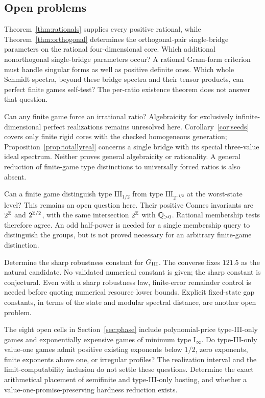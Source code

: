 \subsection{Open problems}
Theorem~\ref{thm:rationals} supplies every positive rational, while Theorem~\ref{thm:orthogonal} determines the orthogonal-pair single-bridge parameters on the rational four-dimensional core. Which additional nonorthogonal single-bridge parameters occur? A rational Gram-form criterion must handle singular forms as well as positive definite ones. Which whole Schmidt spectra, beyond these bridge spectra and their tensor products, can perfect finite games self-test? The per-ratio existence theorem does not answer that question.

Can any finite game force an irrational ratio? Algebraicity for exclusively infinite-dimensional perfect realizations remains unresolved here. Corollary~\ref{cor:seeds} covers only finite rigid cores with the checked homogeneous generation; Proposition~\ref{prop:totallyreal} concerns a single bridge with its special three-value ideal spectrum. Neither proves general algebraicity or rationality. A general reduction of finite-game type distinctions to universally forced ratios is also absent.

Can a finite game distinguish type $\mathrm{III}_{1/2}$ from type $\mathrm{III}_{2^{-1/2}}$ at the worst-state level? This remains an open question here. Their positive Connes invariants are $2^\mathbb Z$ and $2^{\mathbb Z/2}$, with the same intersection $2^\mathbb Z$ with $\mathbb Q_{>0}$. Rational membership tests therefore agree. An odd half-power is needed for a single membership query to distinguish the groups, but is not proved necessary for an arbitrary finite-game distinction.

Determine the sharp robustness constant for $G_{\mathrm{III}}$. The converse fixes $121.5$ as the natural candidate. No validated numerical constant is given; the sharp constant is conjectural. Even with a sharp robustness law, finite-error remainder control is needed before quoting numerical resource lower bounds. Explicit fixed-state gap constants, in terms of the state and modular spectral distance, are another open problem.

The eight open cells in Section~\ref{sec:phase} include polynomial-price type-III-only games and exponentially expensive games of minimum type $\mathrm I_\infty$. Do type-III-only value-one games admit positive existing exponents below $1/2$, zero exponents, finite exponents above one, or irregular profiles? The realization interval and the limit-computability inclusion do not settle these questions. Determine the exact arithmetical placement of semifinite and type-III-only hosting, and whether a value-one-promise-preserving hardness reduction exists.

